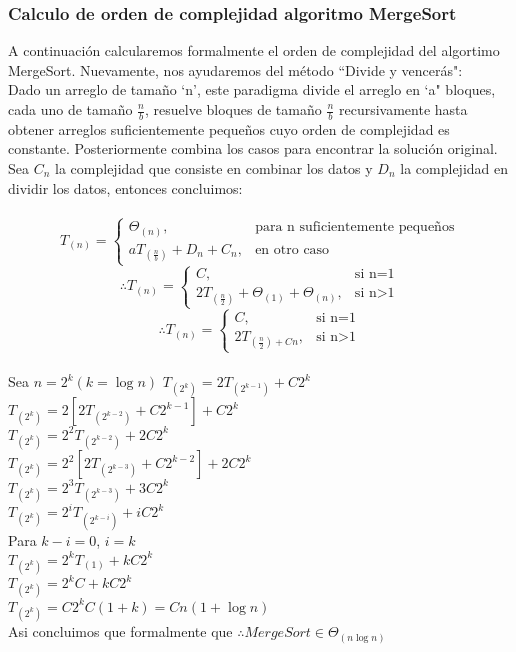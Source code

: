 \documentclass[12pt,twoside]{article}
\begin{document}
\subsubsection{Calculo de orden de complejidad algoritmo MergeSort}
A continuaci\'on calcularemos formalmente el orden de complejidad del algortimo MergeSort.
Nuevamente, nos ayudaremos del método ``Divide y vencerás":\\
Dado un arreglo de tamaño `n', este paradigma divide el arreglo en `a" bloques, cada uno de tamaño $\frac{n}{b}$, resuelve bloques de tamaño $\frac{n}{b}$ recursivamente hasta obtener arreglos suficientemente pequeños cuyo orden de complejidad es constante. Posteriormente combina los casos para encontrar la solución original. Sea $C_{n}$ la complejidad que consiste en combinar los datos y $D_{n}$ la complejidad en dividir los datos, entonces concluimos:\\ \\
$$
T_{(n)}=\begin{cases}
\Theta_{(n)},
& \mbox{para n suficientemente pequeños}\\
aT_{(\frac{n}{b})}+D_{n}+C_{n}, & \mbox{en otro caso}
\end{cases}
$$
$$
\therefore T_{(n)}=\begin{cases}
C,
& \mbox{si n=1}\\
2T_{(\frac{n}{2})}+\Theta_{(1)}+\Theta_{(n)}, & \mbox{si n>1}
\end{cases}
$$
$$
\therefore T_{(n)}=\begin{cases}
C,
& \mbox{si n=1}\\
2T_{(\frac{n}{2})+Cn}, & \mbox{si n>1}
\end{cases}
$$
\\
Sea $n=2^{k} (k=\log n)$
$T_{(2^{k})}=2T_{(2^{k-1})}+C2^{k}$ \\
$T_{(2^{k})}=2[2T_{(2^{k-2})}+C2^{k-1}]+C2^{k}$\\
$T_{(2^{k})}=2^{2}T_{(2^{k-2})}+2C2^{k}$\\
$T_{(2^{k})}=2^{2}[2T_{(2^{k-3})}+C2^{k-2}]+2C2^{k}$\\
$T_{(2^{k})}=2^{3}T_{(2^{k-3})}+3C2^{k}$\\
$T_{(2^{k})}=2^{i}T_{(2^{k-i})}+iC2^{k}$\\
Para $k-i=0$, $i=k$\\
$T_{(2^{k})}=2^{k}T_{(1)}+kC2^{k}$\\
$T_{(2^{k})}=2^{k}C+kC2^{k}$\\
$T_{(2^{k})}=C2^{k}C(1+k)=Cn(1+\log n)$\\
Asi concluimos que formalmente que \newline
$\therefore Merge Sort\in \Theta_{(n \log n)}$\\
\end{document}
